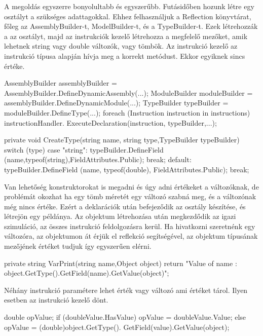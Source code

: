 A megoldás egyszerre bonyolultabb és egyszerűbb. Futásidőben hozunk létre egy osztályt a szükséges adattagokkal. Ehhez felhasználjuk a Reflection könyvtárat, főleg az AssemblyBuilder-t, ModelBuilder-t, és a TypeBuilder-t. Ezek létrehozzák a az osztályt, majd az instrukciók kezelő létrehozza a megfelelő mezőket, amik lehetnek string vagy double változók, vagy tömbök. Az instrukció kezelő az instrukció típusa alapján hívja meg a korrekt metódust. Ekkor egyiknek sincs értéke.

\begin{cpp}
AssemblyBuilder assemblyBuilder = 
AssemblyBuilder.DefineDynamicAssembly(...);
ModuleBuilder moduleBuilder = 
assemblyBuilder.DefineDynamicModule(...);
TypeBuilder typeBuilder = moduleBuilder.DefineType(...);
foreach (Instruction instruction in instructions)
{
        instructionHandler.
        ExecuteDeclaration(instruction, typeBuilder,...);
}


private void CreateType(string name, string type,TypeBuilder typeBuilder)
        {
            switch (type)
            {
                case "string":
                    typeBuilder.DefineField
                    (name,typeof(string),FieldAttributes.Public);
                    break;
                default:
                    typeBuilder.DefineField
                    (name, typeof(double), FieldAttributes.Public);
                    break;
            }
        }
\end{cpp}

Van lehetőség konstruktorokat is megadni és úgy adni értékeket a változóknak, de problémát okozhat ha egy tömb méretét egy változó szabná meg, és a változónak még nincs értéke. Ezért a deklarációk után befejeződik az osztály készítése, és létrejön egy példánya.
Az objektum létrehozása után megkezdődik az igazi szimuláció, az összes instrukció feldolgozásra kerül. Ha hivatkozni szeretnénk egy változóra, az objektumon át érjük el reflekció segítségével, az objektum típusának mezőjének értéket tudjuk így egyszerűen elérni.

\begin{cpp}
private string VarPrint(string name,Object object)
        {
            return "Value of {name} : 
            {object.GetType().GetField(name).GetValue(object)}";
        }
\end{cpp}

Néhány instrukció paramétere lehet érték vagy változó ami értéket tárol. Ilyen esetben az instrukció kezelő dönt.

\begin{cpp}
			double opValue;
            if (doubleValue.HasValue)
            {
                opValue = doubleValue.Value;
            }
            else
            {
                opValue = (double)object.GetType().
                GetField(value).GetValue(object);
            }
\end{cpp}

